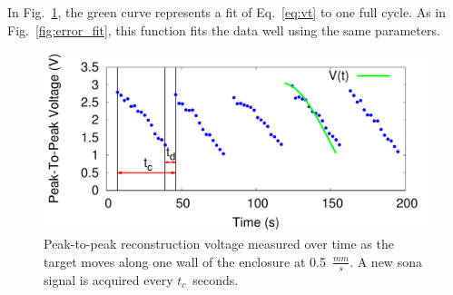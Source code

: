 In Fig.~\ref{fig:moving_recon}, the green curve represents a fit of
Eq.~\ref{eq:vt} to one full cycle. As in Fig.~\ref{fig:error_fit}, this
function fits the data well using the same parameters.


\begin{figure}[t]
\centering
\includegraphics[width=\columnwidth]{figs/moving_recon.pdf}
\caption{Peak-to-peak reconstruction voltage measured over time as the target moves along
one wall of the enclosure at 0.5~$\frac{mm}{s}$. A new sona signal is acquired every $t_{c}$~seconds.}
\label{fig:moving_recon}
\end{figure}

